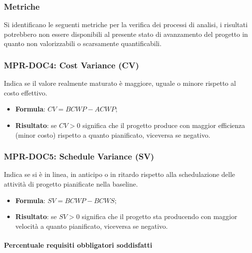 \subsubsection{Metriche}

Si identificano le seguenti metriche per la verifica dei processi di analisi, i risultati potrebbero non essere disponibili al presente stato di avanzamento del progetto
in quanto non valorizzabili o scarsamente quantificabili.



\subsubsection{MPR-DOC4: Cost Variance (CV)} \label{_MPR-DOC4}
Indica se il valore realmente maturato è maggiore, uguale o minore rispetto al costo effettivo.
\begin{itemize}
    \item \textbf{Formula}: $CV = BCWP - ACWP$;
    \item \textbf{Risultato}: se $CV > 0$ significa che il progetto produce con maggior efficienza (minor costo) rispetto a quanto pianificato, viceversa se negativo.
\end{itemize}

\subsubsection{MPR-DOC5: Schedule Variance (SV)} \label{_MPR-DOC5}
Indica se si è in linea, in anticipo o in ritardo rispetto alla schedulazione delle attività di progetto pianificate nella baseline.
\begin{itemize}
    \item \textbf{Formula}: $SV = BCWP - BCWS$;
    \item \textbf{Risultato}: se $SV > 0$ significa che il progetto sta producendo con maggior velocità a quanto pianificato, viceversa se negativo.
\end{itemize}




\paragraph{Percentuale requisiti obbligatori soddisfatti}
    

